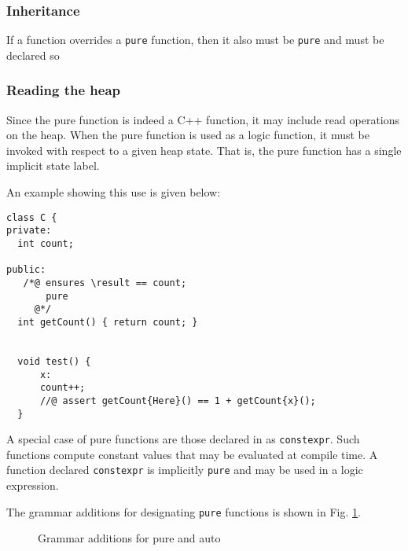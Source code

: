 \subsubsection{Inheritance}
If a function overrides a \lstinline|pure| function, then it also must be \lstinline|pure| and must be declared so

\subsubsection*{Reading the heap}
Since the pure function is indeed a C++ function, it may include read operations on the heap. When the pure function is used as a logic function,
it must be invoked with respect to a given heap state. 
That is, the pure function has a single implicit state label.


An example showing this use is given below:
\begin{lstlisting}
class C {
private:
  int count;

public:
   /*@ ensures \result == count;
       pure
     @*/   
  int getCount() { return count; }
  
  
  void test() {
      x:
      count++;
      //@ assert getCount{Here}() == 1 + getCount{x}();
  }

\end{lstlisting}

A special case of pure functions are those declared in \lang as \lstinline|constexpr|.
Such functions compute constant values that may be evaluated at compile time. A function declared \lstinline|constexpr| is implicitly \lstinline|pure| and may be used in a logic expression.

The grammar additions for designating \lstinline|pure| functions is shown in Fig. \ref{fig:gram:pure}.

\begin{figure}
\begin{cadre}

\end{cadre}
\caption{Grammar additions for pure and auto}
\label{fig:gram:pure}
\end{figure}

